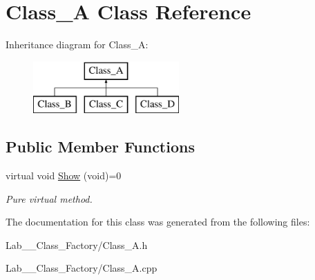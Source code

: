 \hypertarget{class_class___a}{\section{Class\+\_\+\+A Class Reference}
\label{class_class___a}
}
Inheritance diagram for Class\+\_\+\+A\+:\begin{figure}[H]
\begin{center}
\leavevmode
\includegraphics[height=2.000000cm]{class_class___a}
\end{center}
\end{figure}
\subsection*{Public Member Functions}
\begin{DoxyCompactItemize}
\item 
\hypertarget{class_class___a_a374f995672dfef87ae510b79424ed404}{virtual void \hyperlink{class_class___a_a374f995672dfef87ae510b79424ed404}{Show} (void)=0}\label{class_class___a_a374f995672dfef87ae510b79424ed404}

\begin{DoxyCompactList}\small\item\em Pure virtual method. \end{DoxyCompactList}\end{DoxyCompactItemize}


The documentation for this class was generated from the following files\+:\begin{DoxyCompactItemize}
\item 
Lab\+\_\+\_\+\+Class\+\_\+\+Factory/Class\+\_\+\+A.\+h\item 
Lab\+\_\+\_\+\+Class\+\_\+\+Factory/Class\+\_\+\+A.\+cpp\end{DoxyCompactItemize}
